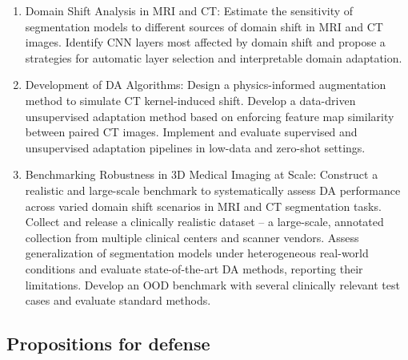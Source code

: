 \begin{enumerate}
    \item Domain Shift Analysis in MRI and CT: Estimate the sensitivity of segmentation models to different sources of domain shift in MRI and CT images. Identify CNN layers most affected by domain shift and propose a strategies for automatic layer selection and interpretable domain adaptation.
    \item Development of DA Algorithms: Design a physics-informed augmentation method to simulate CT kernel-induced shift. Develop a data-driven unsupervised adaptation method based on enforcing feature map similarity between paired CT images. Implement and evaluate supervised and unsupervised adaptation pipelines in low-data and zero-shot settings.
    \item Benchmarking Robustness in 3D Medical Imaging at Scale: Construct a realistic and large-scale benchmark to systematically assess DA performance across varied domain shift scenarios in MRI and CT segmentation tasks. Collect and release a clinically realistic dataset -- a large-scale, annotated collection from multiple clinical centers and scanner vendors. Assess generalization of segmentation models under heterogeneous real-world conditions and evaluate state-of-the-art DA methods, reporting their limitations. Develop an OOD benchmark with several clinically relevant test cases and evaluate standard methods. %
\end{enumerate}




\subsection*{Propositions for defense}

